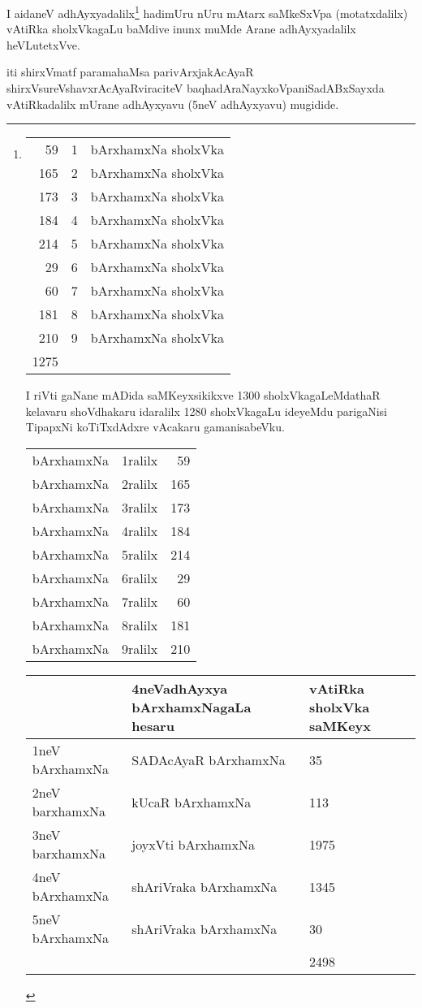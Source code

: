 \begin{artha}
I aidaneV adhAyxyadalilx\footnote[1]{
\begin{tabular}{rll}
59 &1 & bArxhamxNa sholxVka\\
165 & 2 & bArxhamxNa sholxVka\\
173 & 3 & bArxhamxNa sholxVka\\
184 & 4 & bArxhamxNa sholxVka\\
214 & 5 & bArxhamxNa sholxVka\\
29 & 6 & bArxhamxNa sholxVka\\
60 & 7 & bArxhamxNa sholxVka\\
181 & 8 & bArxhamxNa sholxVka\\
210 & 9 & bArxhamxNa sholxVka\\
\hline
1275
\end{tabular}

I riVti gaNane mADida saMKeyxsikikxve
1300 sholxVkagaLeMdathaR kelavaru shoVdhakaru idaralilx 1280 sholxVkagaLu ideyeMdu parigaNisi TipapxNi koTiTxdAdxre vAcakaru gamanisabeVku.

\begin{tabular}{lrr}
bArxhamxNa & 1ralilx & 59\\
bArxhamxNa & 2ralilx & 165\\
bArxhamxNa & 3ralilx & 173\\
bArxhamxNa & 4ralilx & 184\\
bArxhamxNa & 5ralilx & 214\\
bArxhamxNa & 6ralilx & 29\\
bArxhamxNa & 7ralilx & 60\\
bArxhamxNa & 8ralilx & 181\\
bArxhamxNa & 9ralilx & 210
\end{tabular}


\begin{tabular}{|l|l|l|}
\hline
& 4neVadhAyxya bArxhamxNagaLa hesaru & vAtiRka sholxVka saMKeyx\\
\hline
1neV bArxhamxNa & SADAcAyaR bArxhamxNa & 35\\
2neV barxhamxNa & kUcaR bArxhamxNa & 113\\
3neV barxhamxNa & joyxVti bArxhamxNa & 1975\\
4neV bArxhamxNa & shAriVraka bArxhamxNa & 1345\\
5neV bArxhamxNa & shAriVraka bArxhamxNa & 30\\
\hline
& &  2498\\
\hline
\end{tabular}
} hadimUru nUru mAtarx saMkeSxVpa (motatxdalilx) vAtiRka sholxVkagaLu baMdive inunx muMde Arane adhAyxyadalilx heVLutetxVve.
\end{artha}

\begin{center}
iti shirxVmatf paramahaMsa parivArxjakAcAyaR shirxVsureVshavxrAcAyaRviraciteV baqhadAraNayxkoVpaniSadABxSayxda vAtiRkadalilx mUrane adhAyxyavu  (5neV adhAyxyavu) mugidide.
\end{center}

